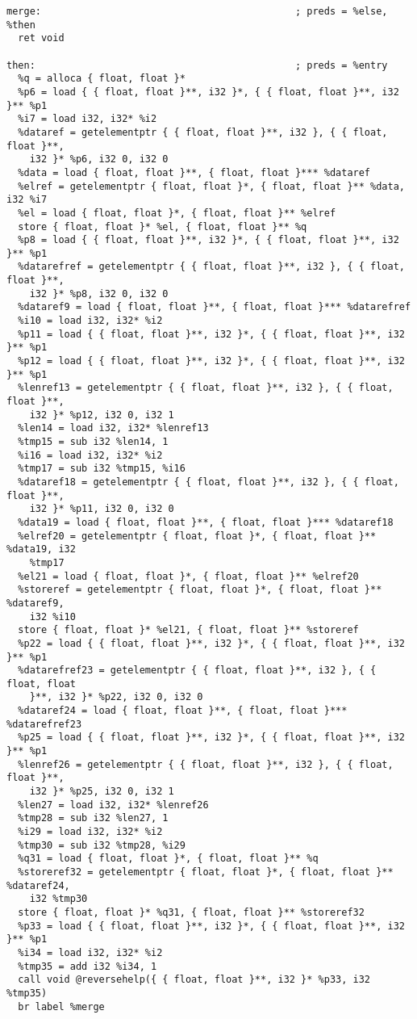 \documentclass[main.tex]{subfiles}
\begin{document}
{\begin{lstlisting}
merge:                                            ; preds = %else, %then
  ret void

then:                                             ; preds = %entry
  %q = alloca { float, float }*
  %p6 = load { { float, float }**, i32 }*, { { float, float }**, i32 }** %p1
  %i7 = load i32, i32* %i2
  %dataref = getelementptr { { float, float }**, i32 }, { { float, float }**, 
    i32 }* %p6, i32 0, i32 0
  %data = load { float, float }**, { float, float }*** %dataref
  %elref = getelementptr { float, float }*, { float, float }** %data, i32 %i7
  %el = load { float, float }*, { float, float }** %elref
  store { float, float }* %el, { float, float }** %q
  %p8 = load { { float, float }**, i32 }*, { { float, float }**, i32 }** %p1
  %datarefref = getelementptr { { float, float }**, i32 }, { { float, float }**,
    i32 }* %p8, i32 0, i32 0
  %dataref9 = load { float, float }**, { float, float }*** %datarefref
  %i10 = load i32, i32* %i2
  %p11 = load { { float, float }**, i32 }*, { { float, float }**, i32 }** %p1
  %p12 = load { { float, float }**, i32 }*, { { float, float }**, i32 }** %p1
  %lenref13 = getelementptr { { float, float }**, i32 }, { { float, float }**,
    i32 }* %p12, i32 0, i32 1
  %len14 = load i32, i32* %lenref13
  %tmp15 = sub i32 %len14, 1
  %i16 = load i32, i32* %i2
  %tmp17 = sub i32 %tmp15, %i16
  %dataref18 = getelementptr { { float, float }**, i32 }, { { float, float }**,
    i32 }* %p11, i32 0, i32 0
  %data19 = load { float, float }**, { float, float }*** %dataref18
  %elref20 = getelementptr { float, float }*, { float, float }** %data19, i32
    %tmp17
  %el21 = load { float, float }*, { float, float }** %elref20
  %storeref = getelementptr { float, float }*, { float, float }** %dataref9, 
    i32 %i10
  store { float, float }* %el21, { float, float }** %storeref
  %p22 = load { { float, float }**, i32 }*, { { float, float }**, i32 }** %p1
  %datarefref23 = getelementptr { { float, float }**, i32 }, { { float, float 
    }**, i32 }* %p22, i32 0, i32 0
  %dataref24 = load { float, float }**, { float, float }*** %datarefref23
  %p25 = load { { float, float }**, i32 }*, { { float, float }**, i32 }** %p1
  %lenref26 = getelementptr { { float, float }**, i32 }, { { float, float }**,
    i32 }* %p25, i32 0, i32 1
  %len27 = load i32, i32* %lenref26
  %tmp28 = sub i32 %len27, 1
  %i29 = load i32, i32* %i2
  %tmp30 = sub i32 %tmp28, %i29
  %q31 = load { float, float }*, { float, float }** %q
  %storeref32 = getelementptr { float, float }*, { float, float }** %dataref24,
    i32 %tmp30
  store { float, float }* %q31, { float, float }** %storeref32
  %p33 = load { { float, float }**, i32 }*, { { float, float }**, i32 }** %p1
  %i34 = load i32, i32* %i2
  %tmp35 = add i32 %i34, 1
  call void @reversehelp({ { float, float }**, i32 }* %p33, i32 %tmp35)
  br label %merge


\end{lstlisting}}
\end{document}
